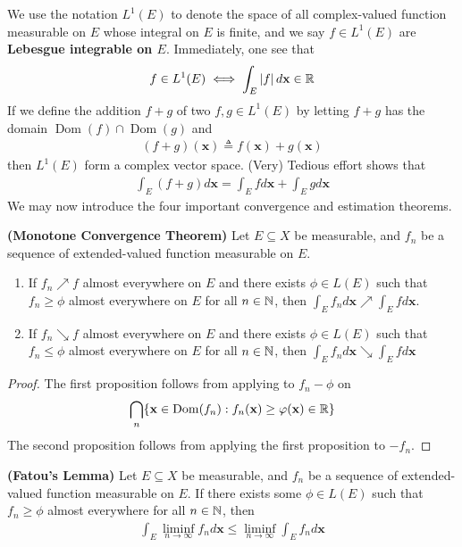 \documentclass{report}
\begin{document}
\begin{mdframed}

We use the notation $L^1(E)$ to denote the space of all complex-valued function measurable on $E$ whose integral on $E$ is finite, and we say $f\in L^1(E)$ are \textbf{Lebesgue integrable on $E$}. Immediately, one see that  
\begin{align*}
f \in L^1(E)\iff \int_E \left|f\right|d\textbf{x}\in\mathbb{R}
\end{align*}
If we define the addition $f+g$ of two $f,g\in L^1(E)$ by letting $f+g$ has the domain  $\operatorname{Dom}(f)\cap \operatorname{Dom}(g)$ and 
\begin{align*}
  (f+g)(\textbf{x})\triangleq f(\textbf{x})+ g(\textbf{x})
\end{align*}
then $L^1(E)$ form a complex vector space. (Very) Tedious effort shows that 
\begin{align*}
\int_E (f+g)d\textbf{x}=\int_E fd\textbf{x}+ \int_E gd\textbf{x}
\end{align*}
We may now introduce the four important convergence and estimation theorems. 
\end{mdframed}
\begin{theorem}
\label{MCT}
\textbf{(Monotone Convergence Theorem)} Let $E\subseteq X$ be measurable, and $f_n$ be a sequence of extended-valued function measurable on $E$.   
\begin{enumerate}[label=(\alph*)]
  \item If $f_n\nearrow f$ almost everywhere on $E$ and there exists  $\phi \in L(E)$ such that $f_n\geq \phi$ almost everywhere on $E$ for all  $n\in\mathbb{N}$, then $\int_E f_nd\textbf{x}\nearrow  \int_E fd\textbf{x}$. 
  \item If $f_n\searrow f$ almost everywhere on  $E$ and there exists  $\phi \in L(E)$ such that $f_n \leq \phi$ almost everywhere on $E$ for all  $n\in\mathbb{N}$, then $\int_E f_nd\textbf{x}\searrow \int_E fd\textbf{x}$
\end{enumerate}
\end{theorem}
\begin{proof}
The first proposition follows from applying  to $f_n - \phi$ on 
\begin{align*}
\bigcap_{n} \{ \textbf{x} \in \operatorname{Dom}(f_n): f_n(\textbf{x})\geq \varphi(\textbf{x})\in\mathbb{R} \}
\end{align*}
The second proposition follows from applying the first proposition to $-f_n$.  
\end{proof}
\begin{theorem}
\label{FL}
\textbf{(Fatou's Lemma)} Let $E\subseteq X$ be measurable, and $f_n$ be a sequence of extended-valued function measurable on $E$. If there exists some $\phi \in L(E)$ such that $f_n\geq \phi $ almost everywhere for all  $n\in\mathbb{N}$, then 
\begin{align*}
\int_E \liminf_{n\to\infty} f_nd\textbf{x}\leq \liminf_{n\to\infty} \int_E f_nd\textbf{x}
\end{align*}
\end{theorem}
\end{document}

